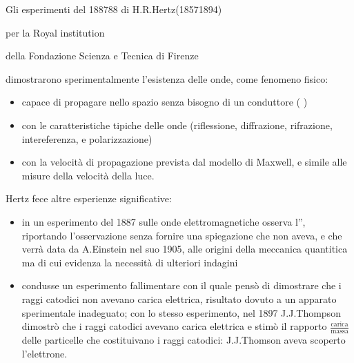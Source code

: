 \documentclass[letterpaper,10pt,italian]{jupyterBook}
\begin{document}
\sphinxAtStartPar
{} Gli esperimenti del 1887\sphinxhyphen{}88 di H.R.Hertz(1857\sphinxhyphen{}1894)%
\begin{footnote}[1]\sphinxAtStartFootnote
{} per la Royal institution
%
\end{footnote}%
\begin{footnote}[2]\sphinxAtStartFootnote
{} della Fondazione Scienza e Tecnica di Firenze
%
\end{footnote} dimostrarono sperimentalmente l’esistenza delle onde, come fenomeno fisico:
\begin{itemize}
\item {} 
\sphinxAtStartPar
capace di propagare nello spazio senza bisogno di un conduttore ( )

\item {} 
\sphinxAtStartPar
con le caratteristiche tipiche delle onde (riflessione, diffrazione, rifrazione, intereferenza, e polarizzazione)

\item {} 
\sphinxAtStartPar
con la velocità di propagazione prevista dal modello di Maxwell, e simile alle misure della velocità della luce.

\end{itemize}

\sphinxAtStartPar
{}  

\sphinxAtStartPar
{} 

\sphinxAtStartPar
Hertz fece altre esperienze significative:
\begin{itemize}
\item {} 
\sphinxAtStartPar
in un esperimento del 1887 sulle onde elettromagnetiche osserva l”, riportando l’osservazione senza fornire una spiegazione \sphinxhyphen{} che non aveva, e che verrà data da A.Einstein nel suo  1905, alle origini della meccanica quantitica \sphinxhyphen{} ma di cui evidenza la necessità di ulteriori indagini

\item {} 
\sphinxAtStartPar
condusse un esperimento fallimentare con il quale pensò di dimostrare che i raggi catodici non avevano carica elettrica, risultato dovuto a un apparato sperimentale inadeguato; con lo stesso esperimento, nel 1897 J.J.Thompson dimostrò che i raggi catodici avevano carica elettrica e stimò il rapporto \(\frac{\text{carica}}{\text{massa}}\) delle particelle che costituivano i raggi catodici: J.J.Thomson aveva scoperto l’elettrone.

\end{itemize}
\end{document}
